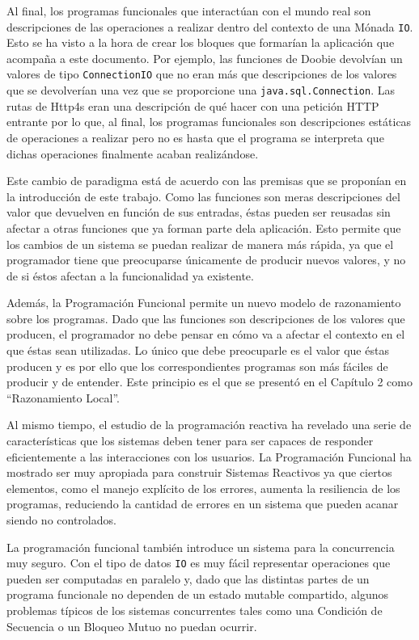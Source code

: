 \documentclass[../main.tex]{subfiles}
\begin{document}
Al final, los programas funcionales que interactúan con el mundo real son descripciones de
las operaciones a realizar dentro del contexto de una Mónada \texttt{IO}. Esto se ha visto
a la hora de crear los bloques que formarían la aplicación que acompaña a este documento. Por ejemplo,
las funciones de Doobie devolvían un valores de tipo \texttt{ConnectionIO} que no eran más que
descripciones de los valores que se devolverían una vez que se proporcione una \texttt{java.sql.Connection}.
Las rutas de Http4s eran una descripción de qué hacer con una petición HTTP entrante por lo que, al
final, los programas funcionales son descripciones estáticas de operaciones a realizar pero
no es hasta que el programa se interpreta que dichas operaciones finalmente acaban realizándose.

Este cambio de paradigma está de acuerdo con las premisas que se proponían en la introducción de este trabajo. 
Como las funciones son meras descripciones del valor que devuelven en función de sus entradas, éstas
pueden ser reusadas sin afectar a otras funciones que ya forman parte dela aplicación. Esto permite
que los cambios de un sistema se puedan realizar de manera más rápida, ya que el programador tiene que 
preocuparse únicamente de producir nuevos valores, y no de si éstos afectan a la funcionalidad ya existente.

Además, la Programación Funcional permite un nuevo modelo de razonamiento sobre los
programas. Dado que las funciones son descripciones de los valores que producen, el
programador no debe pensar en cómo va a afectar el contexto en el que éstas sean utilizadas. Lo 
único que debe preocuparle es el valor que éstas producen y es
por ello que los correspondientes programas son más fáciles de producir y de entender. Este principio es
el que se presentó en el Capítulo 2 como ``Razonamiento Local''.

Al mismo tiempo, el estudio de la programación reactiva ha revelado una serie de
características que los sistemas deben tener para ser capaces de responder eficientemente a 
las interacciones con los usuarios.
La Programación Funcional ha mostrado ser muy apropiada para construir Sistemas Reactivos ya que 
ciertos elementos, como el manejo explícito de los errores, aumenta la resiliencia de
los programas, reduciendo la cantidad de errores en un sistema que pueden acanar siendo no controlados.

La programación funcional también introduce un sistema para la concurrencia muy seguro.
Con el tipo de datos \texttt{IO} es muy fácil representar operaciones que pueden ser
computadas en paralelo y, dado que las distintas partes de un programa funcionale no dependen de un estado
mutable compartido, algunos problemas típicos de los sistemas concurrentes tales como una 
Condición de Secuencia o un Bloqueo Mutuo no puedan ocurrir.
\end{document}

